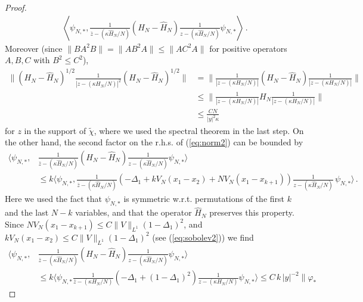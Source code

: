 \documentclass[11pt]{article}
\newcommand{\ph}{\varphi}
\newcommand{\wt}{\widetilde}
\newcommand{\wh}{\widehat}
\begin{document}
\begin{proof}
\begin{equation}
\begin{split}
\left\langle \psi_{N,*} ,
 \frac{1}{\bar{z} - (\kappa \wh H_N/N)} (H_N - \wh H_N)
 \frac{1}{z - (\kappa \wh H_N/N)}\psi_{N,*} \right\rangle\,.
\end{split}
\end{equation}
Moreover (since $\| BA^2B\| = \| AB^2A\| \leq \| AC^2A\|$ for
positive operators $A,B,C$ with $B^2\leq C^2$),
\begin{equation}\label{eq:norm3}
\begin{split}
\Big\| (H_N - \wh H_N)^{1/2}\frac{1}{|z - (\kappa H_N/N)|^2} (H_N -
\wh H_N)^{1/2} \Big\| & = \Big\| \frac{1}{|z - (\kappa H_N/N)|} (H_N
- \wh H_N) \frac{1}{|z - (\kappa H_N/N)|} \Big\|
 \\ &\leq \Big\| \frac{1}{|z - (\kappa H_N/N)|} H_N \frac{1}{|z - (\kappa H_N/N)|} \Big\|
 \\ &\leq \frac{C N}{ |y|^2 \kappa}
\end{split}
\end{equation}
for $z$ in the support of $\wt \chi$, where we used the spectral
theorem in the last step. On the other hand, the second factor on
the r.h.s. of (\ref{eq:norm2}) can be bounded by
\begin{equation}
\begin{split}
\Big\langle \psi_{N,*}, &\frac{1}{\bar{z} - (\kappa \wh H_N/N)} (H_N
- \wh H_N) \frac{1}{z - (\kappa \wh H_N/N)}\psi_{N,*} \Big\rangle \\
&\leq k \Big\langle \psi_{N,*}, \frac{1}{\bar{z} - (\kappa \wh
H_N/N)} \left( -\Delta_1 + k V_N (x_1 -x_2) + N V_N (x_1 -x_{k+1})
\right) \frac{1}{z - (\kappa \wh H_N/N)} \, \psi_{N,*} \Big\rangle
\,. \nonumber
\end{split}
\end{equation}
 Here we used the
fact that $\psi_{N,*}$ is symmetric w.r.t. permutations of the first
$k$ and the last $N-k$ variables, and that the operator $\wh H_N$
preserves this property. Since $N V_N (x_1 -x_{k+1}) \leq C \| V
\|_{L^1} (1-\Delta_1)^2$, and $k V_N (x_1 -x_2) \leq C \| V \|_{L^1}
(1-\Delta_1)^2$ (see (\ref{eq:sobolev2})) we find
\begin{equation}\label{eq:norm5}
\begin{split}
\Big\langle \psi_{N,*}, &\frac{1}{\bar{z} - (\kappa \wh H_N/N)} (H_N
- \wh H_N) \frac{1}{z - (\kappa \wh H_N/N)}\psi_{N,*} \Big\rangle \\
&\leq k \Big\langle \psi_{N,*} \frac{1}{\bar{z} - (\kappa H_N/N)}
\left( -\Delta_1 + (1-\Delta_1)^2 \right)\frac{1}{z - (\kappa
H_N/N)} \psi_{N,*} \Big\rangle \leq C\,  k \, |y|^{-2} \| \ph_*

\end{split}
\end{equation}
\end{proof}
\end{document}
